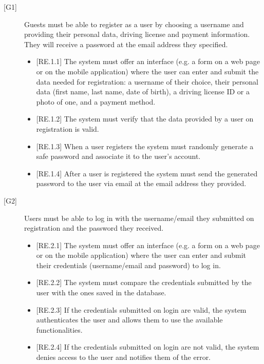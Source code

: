 \documentclass[english]{article}
\begin{document}
\begin{description}

\item[{[G1]}]{Guests must be able to register as a user by choosing a username and providing their personal data, driving license and payment information. They will receive a password at the email address they specified.
	
\begin{itemize}
\item{[RE.1.1] The system must offer an interface (e.g. a form on a web page or on the mobile application) where the user can enter and submit the data needed for registration:
a username of their choice, their personal data (first name, last name, date of birth), a driving license ID or a photo of one, and a payment method.}
\item{[RE.1.2] The system must verify that the data provided by a user on registration is valid.}
\item{[RE.1.3] When a user registers the system must randomly generate a safe password and associate it to the user’s account.}
\item{[RE.1.4] After a user is registered the system must send the generated password to the user via email at the email address they provided.}
\end{itemize}
}

\item[{[G2]}]{Users must be able to log in with the username/email they submitted on registration and the password they received.
\begin{itemize}
	\item{[RE.2.1] The system must offer an interface (e.g. a form on a web page or on the mobile application) where the user can enter and submit their credentials (username/email and password) to log in.}
	\item{[RE.2.2] The system must compare the credentials submitted by the user with the ones saved in the database.}
	\item{[RE.2.3] If the credentials submitted on login are valid, the system authenticates the user and allows them to use the available functionalities.}
	\item{[RE.2.4] If the credentials submitted on login are not valid, the system denies access to the user and notifies them of the error.}
\end{itemize}
}


\end{description}
\end{document}
